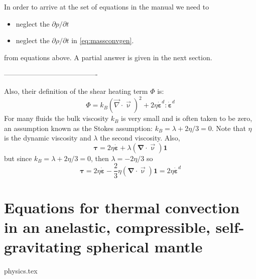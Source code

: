 In order to arrive at the set of equations in the \aspect manual
we need to 
\begin{itemize}
\item neglect the $\partial p/\partial t$  
\item neglect the $\partial \rho / \partial t$  in \eqref{eq:massconvgen}.
\end{itemize}
from equations above. A partial answer is given in the next section. 

----------------------------------------

Also, their definition of the shear heating term $\Phi$ is:
\[
\Phi = k_B ({\vec \nabla}\cdot{\vec \upnu})^2 + 2\eta \dot{\bm \varepsilon}^d:\dot{\bm \varepsilon}^d
\]
For many fluids the bulk viscosity $k_B$ is very small and is often taken to be zero, an assumption known
as the Stokes assumption: $k_B=\lambda+2\eta/3=0$. 
Note that $\eta$ is the dynamic viscosity and $\lambda$ the second viscosity. 
Also, 
\[
{\bm \tau}=2\eta \dot{\bm \varepsilon} + \lambda ({\bm \nabla}\cdot{\vec \upnu}) {\bm 1}
\]
but since $k_B=\lambda+2\eta/3=0$, then $\lambda=-2\eta/3$ so 
\[
{\bm \tau}=2\eta \dot{\bm \varepsilon} -\frac{2}{3}\eta ({\bm \nabla}\cdot{\vec \upnu}) {\bm 1} = 2\eta \dot{\bm \varepsilon}^d
\]

\newpage
\section{Equations for thermal convection in an anelastic, compressible, self-gravitating spherical mantle }
\begin{flushright} {\tiny {\color{gray} physics.tex}} \end{flushright}

